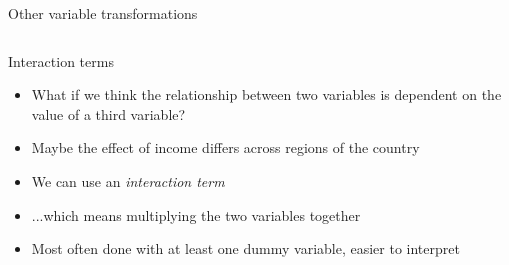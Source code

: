 \begin{frame}{Other variable transformations}
\begin{columns}
\begin{column}{0.34\textwidth}
    \end{column}
  \end{columns}
\end{frame}

\begin{frame}{Interaction terms}
  \begin{itemize}
    \item What if we think the relationship between two variables is dependent on the value of a third variable?
    \item Maybe the effect of income differs across regions of the country
    \item We can use an \emph{interaction term}
    \item ...which means multiplying the two variables together
    \item Most often done with at least one dummy variable, easier to interpret
  \end{itemize}
\end{frame}

